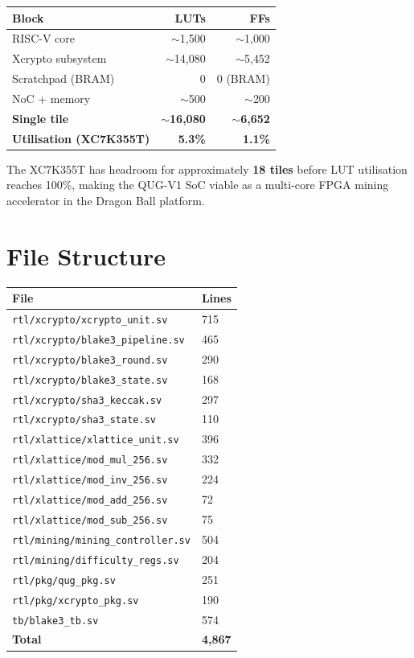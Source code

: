 \documentclass[11pt,a4paper]{article}
\begin{document}
\begin{center}
\begin{tabular}{lrr}
\toprule
\textbf{Block} & \textbf{LUTs} & \textbf{FFs} \\
\midrule
RISC-V core & $\sim$1{,}500 & $\sim$1{,}000 \\
Xcrypto subsystem & $\sim$14{,}080 & $\sim$5{,}452 \\
Scratchpad (BRAM) & 0 & 0 (BRAM) \\
NoC + memory & $\sim$500 & $\sim$200 \\
\midrule
\textbf{Single tile} & $\sim$\textbf{16{,}080} & $\sim$\textbf{6{,}652} \\
\textbf{Utilisation (XC7K355T)} & \textbf{5.3\%} & \textbf{1.1\%} \\
\bottomrule
\end{tabular}
\end{center}

The XC7K355T has headroom for approximately \textbf{18 tiles} before
LUT utilisation reaches 100\%, making the QUG-V1 SoC viable as a
multi-core FPGA mining accelerator in the Dragon Ball platform.

\section{File Structure}

\begin{center}
\begin{tabular}{ll}
\toprule
\textbf{File} & \textbf{Lines} \\
\midrule
\texttt{rtl/xcrypto/xcrypto\_unit.sv}   & 715 \\
\texttt{rtl/xcrypto/blake3\_pipeline.sv} & 465 \\
\texttt{rtl/xcrypto/blake3\_round.sv}   & 290 \\
\texttt{rtl/xcrypto/blake3\_state.sv}   & 168 \\
\texttt{rtl/xcrypto/sha3\_keccak.sv}    & 297 \\
\texttt{rtl/xcrypto/sha3\_state.sv}     & 110 \\
\texttt{rtl/xlattice/xlattice\_unit.sv} & 396 \\
\texttt{rtl/xlattice/mod\_mul\_256.sv}  & 332 \\
\texttt{rtl/xlattice/mod\_inv\_256.sv}  & 224 \\
\texttt{rtl/xlattice/mod\_add\_256.sv}  &  72 \\
\texttt{rtl/xlattice/mod\_sub\_256.sv}  &  75 \\
\texttt{rtl/mining/mining\_controller.sv} & 504 \\
\texttt{rtl/mining/difficulty\_regs.sv} & 204 \\
\texttt{rtl/pkg/qug\_pkg.sv}            & 251 \\
\texttt{rtl/pkg/xcrypto\_pkg.sv}        & 190 \\
\texttt{tb/blake3\_tb.sv}               & 574 \\
\midrule
\textbf{Total} & \textbf{4{,}867} \\
\bottomrule
\end{tabular}
\end{center}
\end{document}
